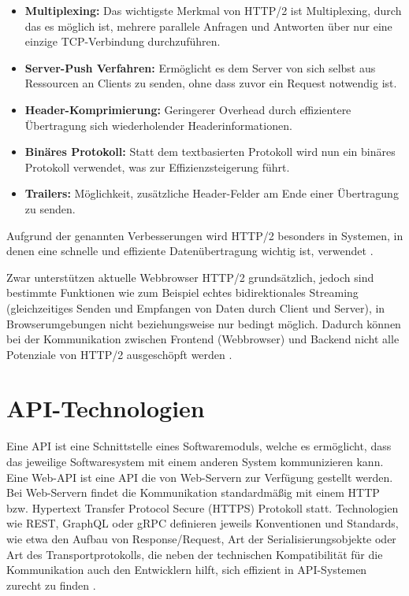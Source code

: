 \begin{itemize}
	\item \textbf{Multiplexing:} Das wichtigste Merkmal von HTTP/2 ist Multiplexing, durch das es möglich ist, mehrere parallele Anfragen und Antworten über nur eine einzige TCP-Verbindung durchzuführen.
	\item \textbf{Server-Push Verfahren:} Ermöglicht es dem Server von sich selbst aus Ressourcen an Clients zu senden, ohne dass zuvor ein Request notwendig ist.
	\item \textbf{Header-Komprimierung:} Geringerer Overhead durch effizientere Übertragung sich wiederholender Headerinformationen.
	\item \textbf{Binäres Protokoll:} Statt dem textbasierten Protokoll wird nun ein binäres Protokoll verwendet, was zur Effizienzsteigerung führt.
	\item \textbf{Trailers:} Möglichkeit, zusätzliche Header-Felder am Ende einer Übertragung zu senden.
\end{itemize}

Aufgrund der genannten Verbesserungen wird HTTP/2 besonders in Systemen, in denen eine schnelle und effiziente Datenübertragung wichtig ist, verwendet \parencite{rfc9113}.

Zwar unterstützen aktuelle Webbrowser HTTP/2 grundsätzlich, jedoch sind bestimmte Funktionen wie zum Beispiel echtes bidirektionales Streaming (gleichzeitiges Senden und Empfangen von Daten durch Client und Server), in Browserumgebungen nicht beziehungsweise nur bedingt möglich. Dadurch können bei der Kommunikation zwischen Frontend (Webbrowser) und Backend nicht alle Potenziale von HTTP/2 ausgeschöpft werden \parencite{aspnet-grpcweb}.

\section{API-Technologien}
Eine API ist eine Schnittstelle eines Softwaremoduls, welche es ermöglicht, dass das jeweilige Softwaresystem mit einem anderen System kommunizieren kann.
Eine Web-API ist eine API die von Web-Servern zur Verfügung gestellt werden. Bei Web-Servern findet die Kommunikation standardmäßig mit einem HTTP bzw. Hypertext Transfer Protocol Secure (HTTPS) Protokoll statt. 
Technologien wie REST, GraphQL oder gRPC definieren jeweils Konventionen und Standards, wie etwa den Aufbau von Response/Request, Art der Serialisierungsobjekte oder Art des Transportprotokolls, die neben der technischen Kompatibilität für die Kommunikation auch den Entwicklern hilft, sich effizient in API-Systemen zurecht zu finden
 \parencite{redhat-apiguide}.

